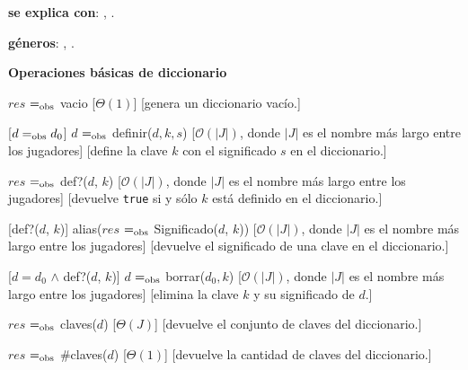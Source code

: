 \documentclass[10pt, a4paper]{article}
\newcommand{\bigO}{\mathcal{O}}
\begin{document}
\begin{Algoritmos}
\begin{Interfaz}
            \textbf{se explica con}: , .
        
            \textbf{géneros}: , .
        
            \textbf{Operaciones básicas de diccionario}
        
            {$res$ $=_{\mathrm{obs}}$ vacio}%
            [$\Theta(1)$]
            [genera un diccionario vacío.]
        
            [$d =_{\mathrm{obs}} d_0$]
            {$d$ $=_{\mathrm{obs}}$ definir($d, k, s$)}
            [$\bigO(|J|)$, donde $|J|$ es el nombre más largo entre los jugadores]
            [define la clave $k$ con el significado $s$ en el diccionario.]
        
            {$res$ $=_{\mathrm{obs}}$ def?($d$, $k$)}
            [$\bigO(|J|)$, donde $|J|$ es el nombre más largo entre los jugadores]
            [devuelve \texttt{true} si y sólo $k$ está definido en el diccionario.]
        
            [def?($d$, $k$)]
            {alias($res$ $=_{\mathrm{obs}}$ Significado($d$, $k$))}
            [$\bigO(|J|)$, donde $|J|$ es el nombre más largo entre los jugadores]
            [devuelve el significado de una clave en el diccionario.]
        
            [$d = d_0$ $\land$ def?($d$, $k$)]
            {$d$ $=_{\mathrm{obs}}$ borrar($d_0, k$)}
            [$\bigO(|J|)$, donde $|J|$ es el nombre más largo entre los jugadores]
            [elimina la clave $k$ y su significado de $d$.]
        
            {$res$ $=_{\mathrm{obs}}$ claves($d$)}
            [$\Theta(J)$]
            [devuelve el conjunto de claves del diccionario.]
        
            {$res$ $=_{\mathrm{obs}}$ \#claves($d$)}
            [$\Theta(1)$]
            [devuelve la cantidad de claves del diccionario.]
        

\end{Interfaz}
\end{Algoritmos}
\end{document}
